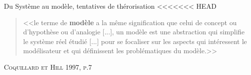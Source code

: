 \documentclass[newPxFont]{beamer}
\begin{document}
\begin{frame}[c]{Du Système au modèle, tentatives de thérorisation}
<<<<<<< HEAD
 \vspace{-1em}
  \begin{quote}
    <<le terme de \textbf{modèle} a la même signification que celui de concept ou d'hypothèse ou d'analogie [...], un modèle est une abstraction qui simplifie le système réel étudié [...] pour se focaliser sur les aspects qui intéressent le modélisateur et qui définissent les problématiques du modèle.>>
  \end{quote}
  \hspace*{\fill}\textsc{Coquillard et Hill 1997, p.7}
  \vspace{-0.5em}
  \begin{figure}
   	\centering
   		 \hspace{0.2em} %
       \hspace{0.2em} %
   		 \hspace{0.2em} %
  \end{figure}
\end{frame}
\end{document}

